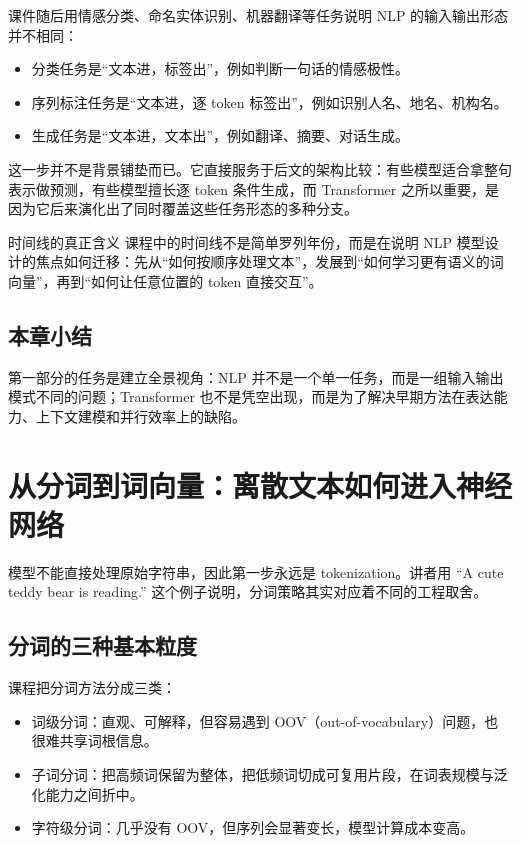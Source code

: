 \documentclass[a4paper]{article}
\begin{document}
课件随后用情感分类、命名实体识别、机器翻译等任务说明 NLP 的输入输出形态并不相同：
\begin{itemize}
\item 分类任务是“文本进，标签出”，例如判断一句话的情感极性。
\item 序列标注任务是“文本进，逐 token 标签出”，例如识别人名、地名、机构名。
\item 生成任务是“文本进，文本出”，例如翻译、摘要、对话生成。
\end{itemize}

这一步并不是背景铺垫而已。它直接服务于后文的架构比较：有些模型适合拿整句表示做预测，有些模型擅长逐 token 条件生成，而 Transformer 之所以重要，是因为它后来演化出了同时覆盖这些任务形态的多种分支。

\begin{importantbox}{时间线的真正含义}
课程中的时间线不是简单罗列年份，而是在说明 NLP 模型设计的焦点如何迁移：先从“如何按顺序处理文本”，发展到“如何学习更有语义的词向量”，再到“如何让任意位置的 token 直接交互”。
\end{importantbox}

\subsection{本章小结}

第一部分的任务是建立全景视角：NLP 并不是一个单一任务，而是一组输入输出模式不同的问题；Transformer 也不是凭空出现，而是为了解决早期方法在表达能力、上下文建模和并行效率上的缺陷。

\section{从分词到词向量：离散文本如何进入神经网络}

模型不能直接处理原始字符串，因此第一步永远是 tokenization。讲者用 ``A cute teddy bear is reading.'' 这个例子说明，分词策略其实对应着不同的工程取舍。

\subsection{分词的三种基本粒度}

课程把分词方法分成三类：
\begin{itemize}
\item 词级分词：直观、可解释，但容易遇到 OOV（out-of-vocabulary）问题，也很难共享词根信息。
\item 子词分词：把高频词保留为整体，把低频词切成可复用片段，在词表规模与泛化能力之间折中。
\item 字符级分词：几乎没有 OOV，但序列会显著变长，模型计算成本变高。
\end{itemize}
\end{document}
